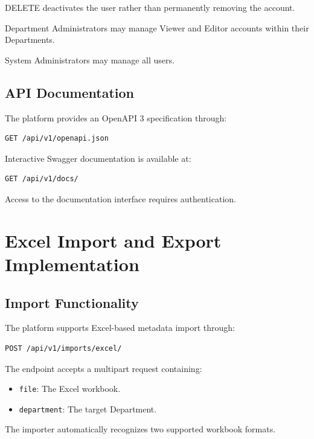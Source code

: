 \documentclass[11pt,a4paper]{article}
\begin{document}
DELETE deactivates the user rather than
permanently removing the account.

Department Administrators may manage
Viewer and Editor accounts within their
Departments.

System Administrators may manage all users.

\subsection{API Documentation}

The platform provides an OpenAPI 3 specification
through:

\begin{lstlisting}
GET /api/v1/openapi.json
\end{lstlisting}

Interactive Swagger documentation is
available at:

\begin{lstlisting}
GET /api/v1/docs/
\end{lstlisting}

Access to the documentation interface
requires authentication.


\section{Excel Import and Export Implementation}

\subsection{Import Functionality}

The platform supports Excel-based metadata
import through:

\begin{lstlisting}
POST /api/v1/imports/excel/
\end{lstlisting}

The endpoint accepts a multipart request
containing:

\begin{itemize}
    \item \texttt{file}: The Excel workbook.
    \item \texttt{department}: The target Department.
\end{itemize}

The importer automatically recognizes
two supported workbook formats.
\end{document}
